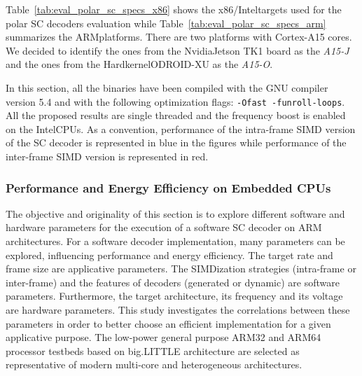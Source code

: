 
Table~\ref{tab:eval_polar_sc_specs_x86} shows the x86/Intel\R targets used for
the polar SC decoders evaluation while Table~\ref{tab:eval_polar_sc_specs_arm}
summarizes the ARM\R platforms. There are two platforms with Cortex-A15 cores.
We decided to identify the ones from the Nvidia\R Jetson TK1 board as the
\emph{A15-J} and the ones from the Hardkernel\R ODROID-XU as the \emph{A15-O}.

In this section, all the binaries have been compiled with the GNU compiler
version 5.4 and with the following optimization flags:
\verb|-Ofast -funroll-loops|. All the proposed results are single threaded and
the frequency boost is enabled on the Intel\R CPUs. As a convention, performance
of the intra-frame SIMD version of the SC decoder is represented in blue in the
figures while performance of the inter-frame SIMD version is represented in red.

\subsubsection{Performance and Energy Efficiency on Embedded CPUs}

The objective and originality of this section is to explore different software
and hardware parameters for the execution of a software SC decoder on ARM\R
architectures. For a software decoder implementation, many parameters can
be explored, influencing performance and energy efficiency. The target rate and
frame size are applicative parameters. The SIMDization strategies (intra-frame
or inter-frame) and the features of decoders (generated or dynamic) are software
parameters. Furthermore, the target architecture, its frequency and its voltage
are hardware parameters. This study investigates the correlations between these
parameters in order to better choose an efficient implementation for a given
applicative purpose. The low-power general purpose ARM32 and ARM64 processor
testbeds based on big.LITTLE architecture are selected as representative of
modern multi-core and heterogeneous architectures.

